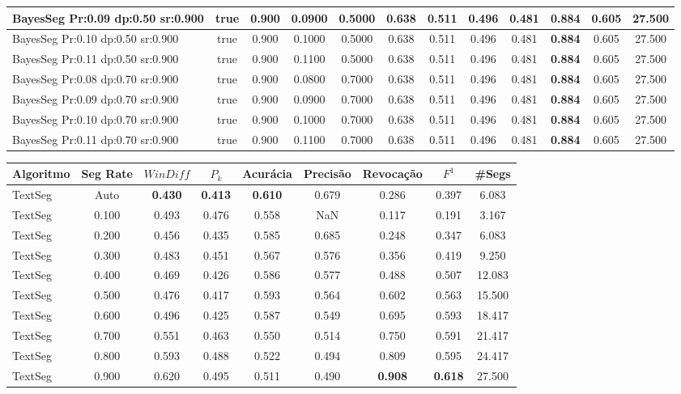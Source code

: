 \documentclass{article}
\begin{document}
\begin{longtable}[c]{|l|c|c|c|c|c|c|c|c|c|c|c|}
 BayesSeg Pr:0.09 dp:0.50 sr:0.900 & true & 0.900 & 0.0900 & 0.5000 & 0.638 & 0.511 & 0.496 & 0.481 & \cellcolor{gray!20} \textbf{0.884} & 0.605 & 27.500  \\ \hline 
 BayesSeg Pr:0.10 dp:0.50 sr:0.900 & true & 0.900 & 0.1000 & 0.5000 & 0.638 & 0.511 & 0.496 & 0.481 & \cellcolor{gray!20} \textbf{0.884} & 0.605 & 27.500  \\ \hline 
 BayesSeg Pr:0.11 dp:0.50 sr:0.900 & true & 0.900 & 0.1100 & 0.5000 & 0.638 & 0.511 & 0.496 & 0.481 & \cellcolor{gray!20} \textbf{0.884} & 0.605 & 27.500  \\ \hline 
 BayesSeg Pr:0.08 dp:0.70 sr:0.900 & true & 0.900 & 0.0800 & 0.7000 & 0.638 & 0.511 & 0.496 & 0.481 & \cellcolor{gray!20} \textbf{0.884} & 0.605 & 27.500  \\ \hline 
 BayesSeg Pr:0.09 dp:0.70 sr:0.900 & true & 0.900 & 0.0900 & 0.7000 & 0.638 & 0.511 & 0.496 & 0.481 & \cellcolor{gray!20} \textbf{0.884} & 0.605 & 27.500  \\ \hline 
 BayesSeg Pr:0.10 dp:0.70 sr:0.900 & true & 0.900 & 0.1000 & 0.7000 & 0.638 & 0.511 & 0.496 & 0.481 & \cellcolor{gray!20} \textbf{0.884} & 0.605 & 27.500  \\ \hline 
 BayesSeg Pr:0.11 dp:0.70 sr:0.900 & true & 0.900 & 0.1100 & 0.7000 & 0.638 & 0.511 & 0.496 & 0.481 & \cellcolor{gray!20} \textbf{0.884} & 0.605 & 27.500  \\ \hline 
 \end{longtable} 
\newpage
\begin{longtable}[c]{|l|c|c|c|c|c|c|c|c|} 
\hline 
Algoritmo & Seg Rate & $WinDiff$ & $P_k$ & Acurácia & Precisão & Revocação & $F^1$ & \#Segs\\ \hline 
TextSeg & Auto & \cellcolor{gray!20} \textbf{0.430} & \cellcolor{gray!20} \textbf{0.413} & \cellcolor{gray!20} \textbf{0.610} & 0.679 & 0.286 & 0.397 & 6.083  \\ \hline 
 TextSeg & 0.100 & 0.493 & 0.476 & 0.558 & NaN & 0.117 & 0.191 & 3.167  \\ \hline 
 TextSeg & 0.200 & 0.456 & 0.435 & 0.585 & 0.685 & 0.248 & 0.347 & 6.083  \\ \hline 
 TextSeg & 0.300 & 0.483 & 0.451 & 0.567 & 0.576 & 0.356 & 0.419 & 9.250  \\ \hline 
 TextSeg & 0.400 & 0.469 & 0.426 & 0.586 & 0.577 & 0.488 & 0.507 & 12.083  \\ \hline 
 TextSeg & 0.500 & 0.476 & 0.417 & 0.593 & 0.564 & 0.602 & 0.563 & 15.500  \\ \hline 
 TextSeg & 0.600 & 0.496 & 0.425 & 0.587 & 0.549 & 0.695 & 0.593 & 18.417  \\ \hline 
 TextSeg & 0.700 & 0.551 & 0.463 & 0.550 & 0.514 & 0.750 & 0.591 & 21.417  \\ \hline 
 TextSeg & 0.800 & 0.593 & 0.488 & 0.522 & 0.494 & 0.809 & 0.595 & 24.417  \\ \hline 
 TextSeg & 0.900 & 0.620 & 0.495 & 0.511 & 0.490 & \cellcolor{gray!20} \textbf{0.908} & \cellcolor{gray!20} \textbf{0.618} & 27.500  \\ \hline 
 \end{longtable} 
\end{document}
